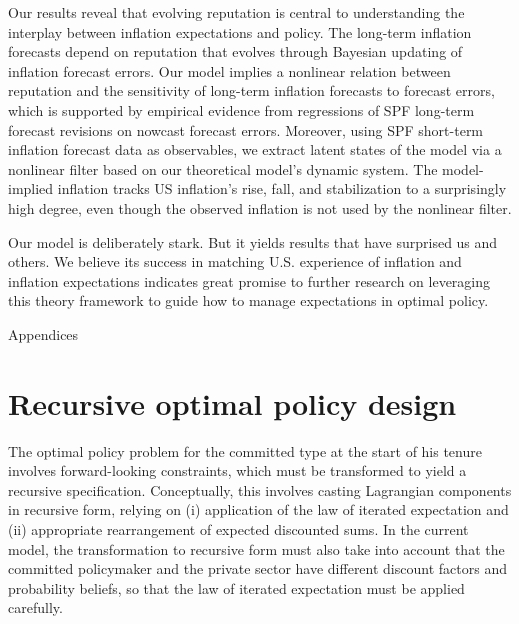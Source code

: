 \documentclass[12pt,letter,leqno]{article}
\theoremstyle{asn}
\theoremstyle{lem}
\theoremstyle{slem}
\theoremstyle{prop}
\theoremstyle{appprop}
\theoremstyle{rem}
\theoremstyle{defn}
\begin{document}
Our results reveal that evolving reputation is central to understanding the interplay between inflation expectations and policy. The long-term inflation forecasts depend on reputation that evolves through Bayesian updating of inflation forecast errors. Our model implies a nonlinear relation between reputation and the sensitivity of long-term inflation forecasts to forecast errors, which is supported by empirical evidence from regressions of SPF long-term forecast revisions on nowcast forecast errors. Moreover, using SPF short-term inflation forecast data as observables, we extract latent states of the model via a nonlinear filter based on our theoretical model's dynamic system. The model-implied inflation tracks US inflation’s rise, fall, and stabilization to a surprisingly high degree, even though the observed inflation is not used by the nonlinear filter.

Our model is deliberately stark. But it yields results that have surprised us and others. We believe its success in matching U.S. experience of inflation and inflation expectations indicates great promise to further research on leveraging this theory framework to guide how to manage expectations in optimal policy.




\newpage
\baselineskip13pt 

%
%





\linespread{1}

\newpage 
\appendix
\begin{center}
{\Large {Appendices} }
\setcounter{footnote}{0}
\setcounter{page}{1}
\end{center}

\section{Recursive optimal policy design}\label{appsec:recursive}
 \renewcommand{\theequation}{A%
\arabic{equation}}

The optimal policy problem for the committed type at the start of his tenure involves forward-looking constraints, which must
be transformed to yield a recursive specification. Conceptually, this
involves casting Lagrangian components in recursive form, relying on (i) application of the law of iterated expectation and
(ii) appropriate rearrangement of expected discounted sums.
In the current model, the transformation to recursive form must also take into account that the committed policymaker and the private sector have different discount
factors and probability beliefs, so that the law of iterated expectation must
be applied carefully.
\end{document}
